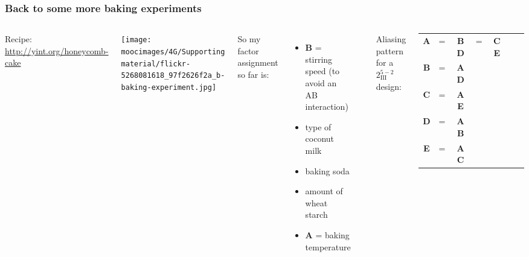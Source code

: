 \documentclass[handout,11pt,aspectratio=169,mathserif]{beamer}
\begin{document}
\begin{frame}\frametitle{Back to some more baking experiments}
	\begin{columns}[T]
		
			\vspace{1cm}
			{\small Recipe: \href{http://yint.org/honeycomb-cake}{http://yint.org/honeycomb-cake}}
		
			\vspace{1cm}
		
			\centerline{\texttt{[image: \\moocimages/4G/Supporting material/flickr-5268081618\_97f2626f2a\_b-baking-experiment.jpg]}}
			
		
			{\color{myOrange}So my factor assignment so far is:}
			\begin{itemize}
				\item	\textbf{B} = stirring speed {\tiny (to avoid an AB interaction)}
				\item	type of coconut milk
				\item	baking soda
				\item	amount of wheat starch
				\item	\textbf{A} = baking temperature
			\end{itemize}
			
			\vspace{0.4cm}
			\hrule
			
			\vspace{0.1cm}
			Aliasing pattern for a $2^{5-2}_{\textrm{III}}$ design:
			\begin{tabulary}{\linewidth}{ccccccc}				
				\textbf{A} & = & \textbf{BD} & = & \textbf{CE}  \\
				\textbf{B} & = & \textbf{AD} &  & \\
				\textbf{C} & = & \textbf{AE} &  & \\
				\textbf{D} & = & \textbf{AB} &  & \\
				\textbf{E} & = & \textbf{AC} &  & 
			\end{tabulary}
			
	\end{columns}
	
	\vspace{1cm}

	
\end{frame}
\end{document}

